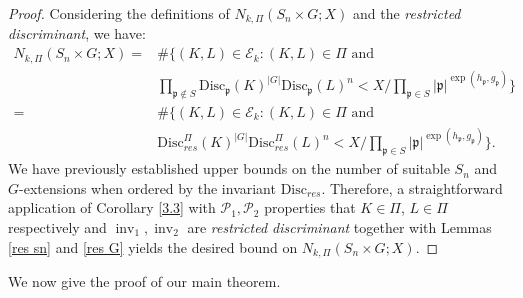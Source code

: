 \documentclass[11pt]{amsart}
\newcommand{\fp}{\mathfrak{p}}
\newcommand{\disc}{\mathrm{Disc}}
\newcommand{\op}[1]{\operatorname{#1}}
\numberwithin{equation}{section}
\begin{document}
\begin{proof}
Considering the definitions of $N_{k,\Pi}(S_n\times G; X)$ and the \textit{restricted discriminant}, we have:
    \begin{align*}
        N_{k,\Pi}(S_n\times G; X)=& \#\{(K,L)\in \mathcal{E}_k: (K,L) \in \Pi \text{ and }\\
         & \prod_{\fp\notin S}\disc_{\fp}(K)^{|G|}\disc_{\fp}(L)^n < {X}/{\prod_{\fp\in S}|\fp|^{\exp(h_{\fp},g_{\fp})}}\}\\
         =& \#\{(K,L)\in \mathcal{E}_k: (K,L) \in \Pi \text{ and }\\
         & \disc_{res}^{\Pi}(K)^{|G|}\disc_{res}^\Pi(L)^n < {X}/{\prod_{\fp\in S}|\fp|^{\exp(h_{\fp},g_{\fp})}}\}.
    \end{align*}
    We have previously established upper bounds on the number of suitable $S_n$ and $G$-extensions when ordered by the invariant $\disc_{res}$. Therefore, a straightforward application of Corollary \ref{3.3} with $\mathcal{P}_1, \mathcal{P}_2$ properties that $K \in \Pi$, $L \in \Pi$ respectively and $\op{inv}_1, \op{inv}_2$ are \textit{restricted discriminant} together with Lemmas \ref{res sn} and \ref{res G} yields the desired bound on $N_{k,\Pi}(S_n\times G; X)$.
\end{proof}


\par We now give the proof of our main theorem. 
\end{document}
